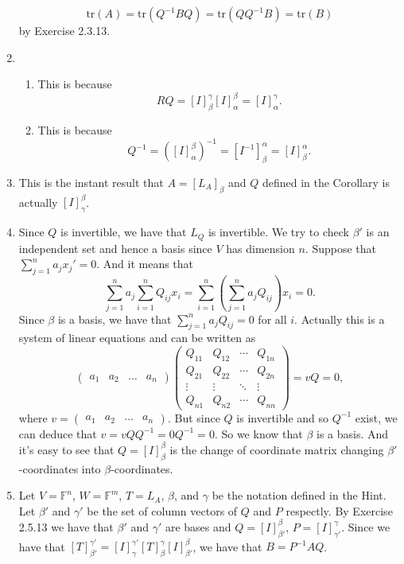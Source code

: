 \begin{enumerate}
\[\mathrm{tr}(A)=\mathrm{tr}(Q^{-1}BQ)=\mathrm{tr}(QQ^{-1}B)=\mathrm{tr}(B)\]
by  Exercise 2.3.13.
\item \begin{enumerate}
\item This is because 
\[RQ=[I]_{\beta}^{\gamma}[I]_{\alpha}^{\beta}=[I]_{\alpha}^{\gamma}.\]
\item This is because 
\[Q^{-1}=([I]_{\alpha}^{\beta})^{-1}=[I^{-1}]_{\beta}^{\alpha}=[I]_{\beta}^{\alpha}.\]
\end{enumerate}
\item This is the instant result that $A=[L_A]_{\beta}$ and $Q$ defined in the Corollary is actually $[I]_{\gamma}^{\beta}$.
\item Since $Q$ is invertible, we have that $L_Q$ is invertible. We try to check $\beta'$ is an independent set and hence a basis since $V$ has dimension $n$. Suppose that $\sum_{j=1}^n{a_jx_j'}=0$. And it means that 
\[\sum_{j=1}^n{a_j\sum_{i=1}^n{Q_{ij}x_i}}=\sum_{i=1}^n{(\sum_{j=1}^n{a_jQ_{ij}})x_i}=0.\]
Since $\beta $ is a basis, we have that $\sum_{j=1}^n{a_jQ_{ij}}=0$ for all $i$. Actually this is a system of linear equations and can be written as 
\[\left(\begin{array}{cccc}a_1&a_2&\ldots &a_n\end{array}\right)\left(\begin{array}{cccc}Q_{11}&Q_{12}&\cdots &Q_{1n}\\Q_{21}&Q_{22}&\cdots &Q_{2n}\\\vdots &\vdots &\ddots &\vdots \\Q_{n1}&Q_{n2}&\cdots &Q_{nn}\end{array}\right)=vQ=0,\]
where $v=\left(\begin{array}{cccc}a_1&a_2&\ldots &a_n\end{array}\right)$.
But since $Q$ is invertible and so $Q^{-1}$ exist, we can deduce that $v=vQQ^{-1}=0Q^{-1}=0$. So we know that $\beta $ is a basis. And it's easy to see that $Q=[I]_{\beta}^{\beta}$ is the change of coordinate matrix changing $\beta'$-coordinates into $\beta$-coordinates.
\item Let $V=\mathbb{F}^n$, $W=\mathbb{F}^m$, $T=L_A$, $\beta $, and $\gamma $ be the notation defined in the Hint. Let $\beta'$ and $\gamma'$ be the set of column vectors of $Q$ and $P$ respectly. By Exercise 2.5.13 we have that $\beta'$ and $\gamma'$ are bases and $Q=[I]_{\beta'}^{\beta}$, $P=[I]_{\gamma'}^{\gamma}$. Since we have that $[T]_{\beta'}^{\gamma'}=[I]_{\gamma}^{\gamma'}[T]_{\beta}^{\gamma}[I]_{\beta'}^{\beta}$, we have that $B=P^{-1}AQ$.
\end{enumerate}